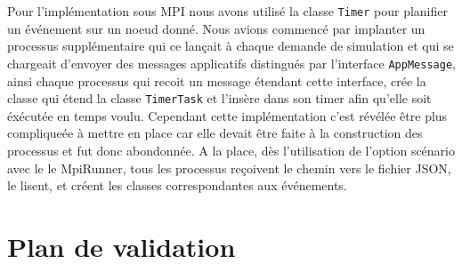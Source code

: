 \documentclass{article}
\begin{document}
				\vspace{5mm}
				Pour l'implémentation sous MPI nous avons utilisé la classe \verb|Timer| pour planifier un événement sur un noeud donné.
				\newline
				Nous avions commencé par implanter un processus supplémentaire qui ce lançait à chaque demande de simulation et qui se chargeait d'envoyer des 
				messages applicatifs distingués par l'interface \verb|AppMessage|, ainsi chaque processus qui recoit un message étendant cette interface, crée la classe 
				qui étend la classe \verb|TimerTask| et l'insère dans son timer afin qu'elle soit éxécutée en temps voulu.
				\newline
				Cependant cette implémentation c'est révélée être plus compliqueée à mettre en place car elle devait être faite à la construction des processus et fut donc abondonnée.
				\newline
				A la place, dès l'utilisation de l'option scénario avec le le MpiRunner, tous les processus reçoivent le chemin vers le fichier JSON, le lisent, et créent les classes correspondantes aux événements. 
		
				
		\newpage
		\section{Plan de validation}
\end{document}
